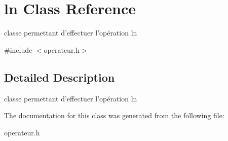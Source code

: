 \hypertarget{classln}{
\section{ln Class Reference}
\label{classln}
}


classe permettant d'effectuer l'opération ln  




{\ttfamily \#include $<$operateur.h$>$}



\subsection{Detailed Description}
classe permettant d'effectuer l'opération ln 

The documentation for this class was generated from the following file:\begin{DoxyCompactItemize}
\item 
operateur.h\end{DoxyCompactItemize}
